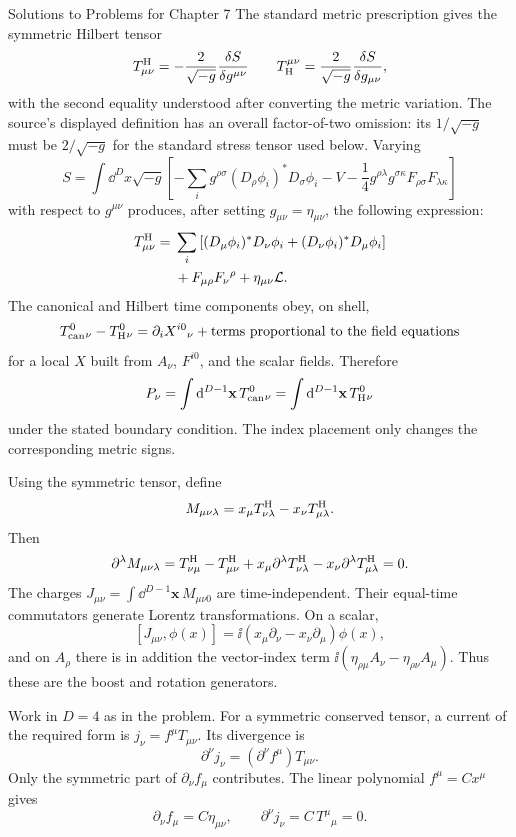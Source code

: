\begin{bankssolutions}{Solutions to Problems for Chapter 7}
The standard metric prescription gives the symmetric Hilbert tensor
\[
 T_{\mu\nu}^{\rm H}
 =-\frac{2}{\sqrt{-g}}\frac{\delta S}{\delta g^{\mu\nu}}
 \qquad
 T_{\rm H}^{\mu\nu}
 =\frac{2}{\sqrt{-g}}\frac{\delta S}{\delta g_{\mu\nu}},
\]
with the second equality understood after converting the metric variation.
The source's displayed definition has an overall factor-of-two omission:
its $1/\sqrt{-g}$ must be $2/\sqrt{-g}$ for the standard stress tensor used
below.  Varying
\[
 S=\int\dd^D x\sqrt{-g}\left[
 -\sum_i g^{\rho\sigma}(D_\rho\phi_i)^*D_\sigma\phi_i
 -V-\frac14g^{\rho\lambda}g^{\sigma\kappa}
 F_{\rho\sigma}F_{\lambda\kappa}\right]
\]
with respect to $g^{\mu\nu}$ produces, after setting
$g_{\mu\nu}=\eta_{\mu\nu}$, the following expression:
\begin{align*}
 T_{\mu\nu}^{\rm H}
 ={}&\sum_i\left[(D_\mu\phi_i)^*D_\nu\phi_i
 +(D_\nu\phi_i)^*D_\mu\phi_i\right]\\
 &+F_{\mu\rho}F_\nu{}^\rho+\eta_{\mu\nu}\mathcal L.
\end{align*}
The canonical and Hilbert time components
obey, on shell,
\[
 T_{\rm can}^{0}{}_{\nu}-T_{\rm H}^{0}{}_{\nu}
 =\partial_i X^{i0}{}_{\nu}
 +\text{terms proportional to the field equations}
\]
for a local $X$ built from $A_\nu$, $F^{i0}$, and the scalar fields.
Therefore
\[
 P_\nu=\int\mathop{}\!\mathrm{d}^{D-1}\mathbf x\,T_{\rm can}^{0}{}_{\nu}
 =\int\mathop{}\!\mathrm{d}^{D-1}\mathbf x\,T_{\rm H}^{0}{}_{\nu}
\]
under the stated boundary condition.  The index placement only changes the
corresponding metric signs.

Using the symmetric tensor, define
\[
 M_{\mu\nu\lambda}
 =x_\mu T_{\nu\lambda}^{\rm H}
 -x_\nu T_{\mu\lambda}^{\rm H}.
\]
Then
\[
 \partial^\lambda M_{\mu\nu\lambda}
 =T_{\nu\mu}^{\rm H}-T_{\mu\nu}^{\rm H}
 +x_\mu\partial^\lambda T_{\nu\lambda}^{\rm H}
 -x_\nu\partial^\lambda T_{\mu\lambda}^{\rm H}=0.
\]
The charges
 $J_{\mu\nu}=\int\dd^{D-1}\mathbf x\,M_{\mu\nu0}$ are time-independent.  Their
equal-time commutators generate Lorentz transformations.  On a scalar,
\[
 [J_{\mu\nu},\phi(x)]
 =\ii(x_\mu\partial_\nu-x_\nu\partial_\mu)\phi(x),
\]
and on $A_\rho$ there is in addition the vector-index term
$\ii(\eta_{\rho\mu}A_\nu-\eta_{\rho\nu}A_\mu)$.  Thus these are the
boost and rotation generators.

Work in $D=4$ as in the problem.  For a symmetric conserved tensor, a current
of the required form is
$j_\nu=f^\mu T_{\mu\nu}$.  Its divergence is
\[
 \partial^\nu j_\nu=(\partial^\nu f^\mu)T_{\mu\nu}.
\]
Only the symmetric part of $\partial_\nu f_\mu$ contributes.  The linear
polynomial $f^\mu=Cx^\mu$ gives
\[
 \partial_\nu f_\mu=C\eta_{\mu\nu},
 \qquad
 \partial^\nu j_\nu=C\,T^\mu{}_\mu=0.
\]


\end{bankssolutions}
